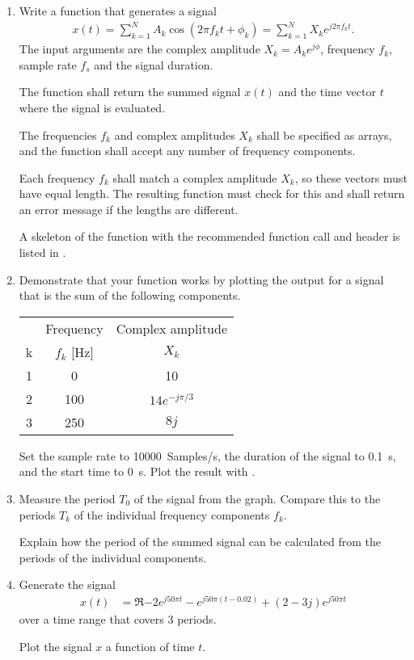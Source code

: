 \begin{enumerate}[1)]
	\item Write a function that generates a signal
	\begin{align*}
		x(t)= \sum_{k=1}^{N} A_k \cos(2\pi f_k t + \phi_k) =\sum_{k=1}^{N} X_k e^{j2\pi f_k t}.
	\end{align*}
	The input arguments are the complex amplitude $X_k=A_k e^{j\phi}$, frequency $f_k$, sample rate $f_s$ and the signal duration.
	
	The function shall return the summed signal $x(t)$ and the time vector $t$ where the signal is evaluated.
	
	The frequencies $f_k$ and complex amplitudes $X_k$ shall be specified as \numpy arrays, and the function shall accept any number of frequency components. 
	
	Each frequency $f_k$ shall match a complex amplitude $X_k$, so these vectors must have equal length. The resulting function must check for this and shall return an error message if the lengths are different. 
	
	A skeleton of the function with the recommended function call and header is listed in . 
	
	
	\item Demonstrate that your function works by plotting the output for a signal that is the sum of the following components.
	\begin{center}
		\begin{tabular}{ccc}
				&	Frequency	& Complex amplitude	\\
			k	&	$f_k$ [Hz]		& $X_k$  			\\
			\hline
			1	&	\num{0}		& \num{10}				\\
			2	&	\num{100}	& $14e^{-j\pi/3}$		\\
			3	&	\num{250}	& 	$8j$				\\
		\hline
		\end{tabular}
	\end{center}
	Set the sample rate to \qty{10000}{Samples/s}, the duration of the signal to \qty{0.1}{s}, and the start time to \qty{0}{s}. Plot the result with \matplotlib.
	
	\item Measure the period $T_0 $ of the signal from the graph. Compare this to the periods $T_k$ of the individual frequency components $f_k$.
	
	Explain how the period of the summed signal can be calculated from the periods of the individual components.
	
	\item Generate the signal
	\begin{align*}
		x(t) &= \Re{-2e^{j50\pi t} - e^{j50\pi(t-0.02)} +(2-3j)e^{j50\pi t}   } 
	\end{align*}
	over a time range that covers 3 periods. 
	
	Plot the signal $x$ a function of time $t$.

\end{enumerate}

